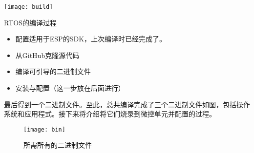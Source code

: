 \begin{marginfigure}[0cm]
	\texttt{[image: build]}
	\caption[build]{RTOS的编译过程}
\end{marginfigure}

\begin{itemize}
	\item 配置适用于ESP的SDK，上次编译时已经完成了。
	\item 从GitHub克隆源代码
	\item 编译可引导的二进制文件
	\item 安装与配置（这一步放在后面进行）
\end{itemize}

最后得到一个二进制文件。至此，总共编译完成了三个二进制文件如图，包括操作系统和应用程式。接下来将介绍将它们烧录到微控单元并配置的过程。

\begin{figure*}[h!]
	\texttt{[image: bin]}
	\caption[bin]{所需所有的二进制文件}
\end{figure*}
